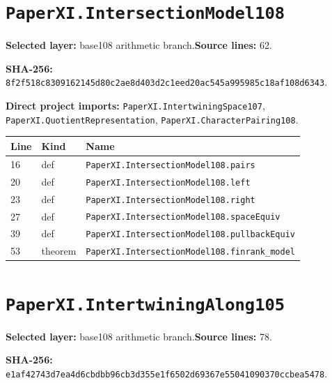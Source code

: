 \documentclass[10pt,oneside]{book}
\begin{document}
\section{\texorpdfstring{\nolinkurl{PaperXI.IntersectionModel108}}{PaperXI.IntersectionModel108}}\label{module:PaperXI.IntersectionModel108}

\textbf{Selected layer:} base108 arithmetic branch.\quad\textbf{Source lines:} 62.\par\textbf{SHA-256:} {\scriptsize\nolinkurl{8f2f518c8309162145d80c2ae8d403d2c1eed20ac545a995985c18af108d6343}}.


\textbf{Direct project imports:} \nolinkurl{PaperXI.IntertwiningSpace107}, \nolinkurl{PaperXI.QuotientRepresentation}, \nolinkurl{PaperXI.CharacterPairing108}.

\begin{longtable}{@{}p{}p{}p{}@{}}\toprule Line&Kind&Name\\\midrule\endhead

16&def&\nolinkurl{PaperXI.IntersectionModel108.pairs}\\

20&def&\nolinkurl{PaperXI.IntersectionModel108.left}\\

23&def&\nolinkurl{PaperXI.IntersectionModel108.right}\\

27&def&\nolinkurl{PaperXI.IntersectionModel108.spaceEquiv}\\

39&def&\nolinkurl{PaperXI.IntersectionModel108.pullbackEquiv}\\

53&theorem&\nolinkurl{PaperXI.IntersectionModel108.finrank_model}\\

\bottomrule\end{longtable}

\section{\texorpdfstring{\nolinkurl{PaperXI.IntertwiningAlong105}}{PaperXI.IntertwiningAlong105}}\label{module:PaperXI.IntertwiningAlong105}

\textbf{Selected layer:} base108 arithmetic branch.\quad\textbf{Source lines:} 78.\par\textbf{SHA-256:} {\scriptsize\nolinkurl{e1af42743d7ea4d6cbdbb96cb3d355e1f6502d69367e55041090370ccbea5478}}.
\end{document}
